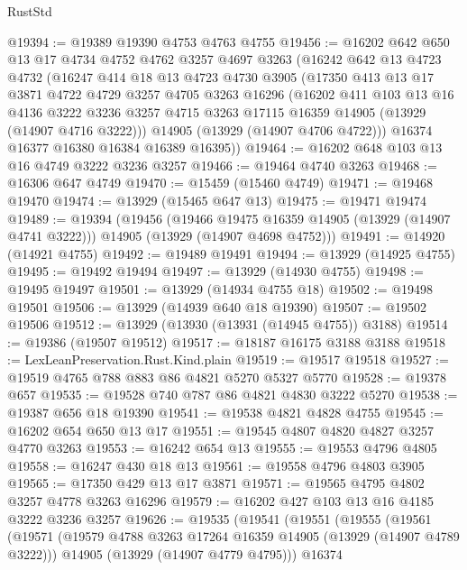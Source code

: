 \begin{lexlean}{RustStd}
\begin{coremodule}
@19394 := @19389 @19390 @4753 @4763 @4755
@19456 := @16202
    @642
    @650
    @13
    @17
    @4734
    @4752
    @4762
    @3257
    @4697
    @3263
    (@16242
      @642
      @13
      @4723
      @4732
      (@16247
        @414
        @18
        @13
        @4723
        @4730
        @3905
        (@17350
          @413
          @13
          @17
          @3871
          @4722
          @4729
          @3257
          @4705
          @3263
          @16296
          (@16202
            @411
            @103
            @13
            @16
            @4136
            @3222
            @3236
            @3257
            @4715
            @3263
            @17115
            @16359
            @14905
            (@13929 (@14907 @4716 @3222)))
          @14905
          (@13929 (@14907 @4706 @4722)))
        @16374
        @16377
        @16380
        @16384
        @16389
        @16395))
@19464 := @16202 @648 @103 @13 @16 @4749 @3222 @3236 @3257
@19466 := @19464 @4740 @3263
@19468 := @16306 @647 @4749
@19470 := @15459 (@15460 @4749)
@19471 := @19468 @19470
@19474 := @13929 (@15465 @647 @13)
@19475 := @19471 @19474
@19489 := @19394
    (@19456
      (@19466 @19475 @16359 @14905 (@13929 (@14907 @4741 @3222)))
      @14905
      (@13929 (@14907 @4698 @4752)))
@19491 := @14920 (@14921 @4755)
@19492 := @19489 @19491
@19494 := @13929 (@14925 @4755)
@19495 := @19492 @19494
@19497 := @13929 (@14930 @4755)
@19498 := @19495 @19497
@19501 := @13929 (@14934 @4755 @18)
@19502 := @19498 @19501
@19506 := @13929 (@14939 @640 @18 @19390)
@19507 := @19502 @19506
@19512 := @13929 (@13930 (@13931 (@14945 @4755)) @3188)
@19514 := @19386 (@19507 @19512)
@19517 := @18187 @16175 @3188 @3188
@19518 := LexLeanPreservation.Rust.Kind.plain
@19519 := @19517 @19518
@19527 := @19519 @4765 @788 @883 @86 @4821 @5270 @5327 @5770
@19528 := @19378 @657
@19535 := @19528 @740 @787 @86 @4821 @4830 @3222 @5270
@19538 := @19387 @656 @18 @19390
@19541 := @19538 @4821 @4828 @4755
@19545 := @16202 @654 @650 @13 @17
@19551 := @19545 @4807 @4820 @4827 @3257 @4770 @3263
@19553 := @16242 @654 @13
@19555 := @19553 @4796 @4805
@19558 := @16247 @430 @18 @13
@19561 := @19558 @4796 @4803 @3905
@19565 := @17350 @429 @13 @17 @3871
@19571 := @19565 @4795 @4802 @3257 @4778 @3263 @16296
@19579 := @16202 @427 @103 @13 @16 @4185 @3222 @3236 @3257
@19626 := @19535
    (@19541
      (@19551
        (@19555
          (@19561
            (@19571
              (@19579 @4788 @3263 @17264 @16359 @14905 (@13929 (@14907 @4789 @3222)))
              @14905
              (@13929 (@14907 @4779 @4795)))
            @16374

\end{coremodule}
\end{lexlean}
